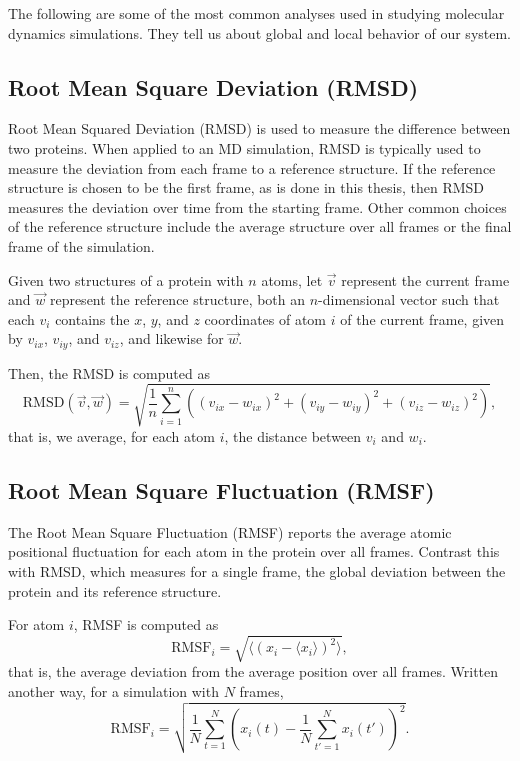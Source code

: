 The following are some of the most common analyses used in studying molecular dynamics simulations. They tell us about global and local behavior of our system.

\subsection{Root Mean Square Deviation (RMSD)}

Root Mean Squared Deviation (RMSD) is used to measure the difference between two proteins. When applied to an MD simulation, RMSD is typically used to measure the deviation from each frame to a reference structure. If the reference structure is chosen to be the first frame, as is done in this thesis, then RMSD measures the deviation over time from the starting frame. Other common choices of the reference structure include the average structure over all frames or the final frame of the simulation.

Given two structures of a protein with \(n\) atoms, let \(\vec{v}\) represent the current frame and \(\vec{w}\) represent the reference structure, both an \(n\)-dimensional vector such that each \(v_{i}\) contains the \(x\), \(y\), and \(z\) coordinates of atom \(i\) of the current frame, given by \(v_{ix}\), \(v_{iy}\), and \(v_{iz}\), and likewise for \(\vec{w}\).

\noindent Then, the RMSD is computed as \[\text{RMSD}(\vec{v}, \vec{w}) = \sqrt{\frac{1}{n}\sum\limits_{i=1}^{n}((v_{ix} - w_{ix})^{2} + (v_{iy} - w_{iy})^{2} + (v_{iz} - w_{iz})^{2})},\] that is, we average, for each atom \(i\), the distance between \(v_{i}\) and \(w_{i}\).

\subsection{Root Mean Square Fluctuation (RMSF)}

The Root Mean Square Fluctuation (RMSF) reports the average atomic positional fluctuation for each atom in the protein over all frames. Contrast this with RMSD, which measures for a single frame, the global deviation between the protein and its reference structure.

\noindent For atom \(i\), RMSF is computed as \[\text{RMSF}_{i} = \sqrt{\langle(x_{i}- \langle x_{i}\rangle)^{2}\rangle},\] that is, the average deviation from the average position over all frames. Written another way, for a simulation with \(N\) frames, \[
\mathrm{RMSF}_i
=
\sqrt{
\frac{1}{N}
\sum_{t=1}^{N}
\left(x_i(t)-\frac{1}{N}\sum_{t'=1}^{N} x_i(t')\right)^2
}.\]

